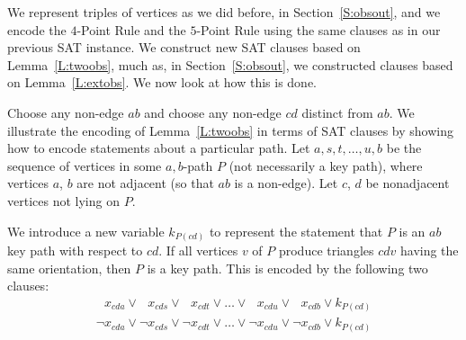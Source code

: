 \documentclass[12pt]{amsart}
\theoremstyle{remark}
\begin{document}
We represent triples of vertices
as we did before, in Section~\ref{S:obsout},
and
we encode the $4$-Point Rule and the $5$-Point Rule using the same clauses
as in our previous SAT instance.
We construct new SAT clauses based on Lemma~\ref{L:twoobs},
much as, in Section~\ref{S:obsout}, we constructed clauses based on
Lemma~\ref{L:extobs}.
We now look at how this is done.



Choose any non-edge $ab$ and choose any non-edge $cd$ distinct from $ab$. We illustrate the encoding of Lemma~\ref{L:twoobs} in terms of SAT clauses by showing how to encode statements about a particular path. Let $a,s,t,\dots,u,b$ be the sequence of vertices in some $a,b$-path $P$ (not necessarily a key path), where vertices $a$, $b$ are not adjacent (so that $ab$ is a non-edge). Let $c$, $d$ be nonadjacent vertices not lying on $P$. 

We introduce a new variable $k_{P(cd)}$ to represent the statement that
$P$ is an $ab$ key path with respect to $cd$.
If all vertices $v$ of $P$ produce triangles $cdv$
having the same orientation, then $P$ is a key path.
This is encoded by the following two clauses: 
\begin{gather}
\label{Cl:twoobs3}
\phantom{\neg} x_{cda} \vee \phantom{\neg} x_{cds} \vee
  \phantom{\neg} x_{cdt} \vee \dots \vee \phantom{\neg} x_{cdu}
  \vee \phantom{\neg} x_{cdb}
  \vee k_{P(cd)}\\
\label{Cl:twoobs4}
\neg x_{cda} \vee \neg x_{cds} \vee
  \neg x_{cdt} \vee \dots \vee \neg x_{cdu}
  \vee \neg x_{cdb}
  \vee k_{P(cd)}
\end{gather}
\end{document}
